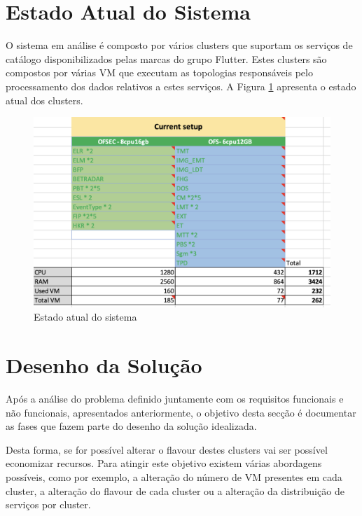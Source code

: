 \section{Estado Atual do Sistema}

O sistema em análise é composto por vários \glspl{cluster} que suportam os serviços de catálogo
disponibilizados pelas marcas do grupo Flutter. Estes \glspl{cluster} são compostos por várias
\ac{VM} que executam as topologias responsáveis pelo processamento dos dados relativos a estes
serviços. A Figura \ref{strat-current} apresenta o estado atual dos \glspl{cluster}.

\begin{figure}[H]
  \centerline{\includegraphics[scale=0.5]{media/content/analise/strat-current.png}}
  \caption{Estado atual do sistema}
  \label{strat-current}
\end{figure}


\section{Desenho da Solução}

Após a análise do problema definido juntamente com os requisitos funcionais e não funcionais,
apresentados anteriormente, o objetivo desta secção é documentar as fases que fazem parte do
desenho da solução idealizada.

Desta forma, se for possível alterar o \gls{flavour} destes \glspl{cluster} vai ser possível economizar
recursos. Para atingir este objetivo existem várias abordagens possíveis, como por exemplo, a
alteração do número de \ac{VM} presentes em cada \gls{cluster}, a alteração do \gls{flavour}
de cada \gls{cluster} ou a alteração da distribuição de serviços por \gls{cluster}.

